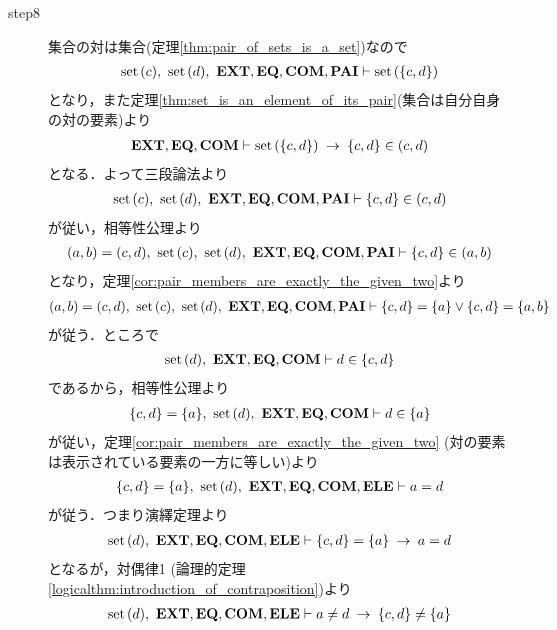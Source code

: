 \begin{sketch}
\begin{description}
			\item[step8] 集合の対は集合(定理\ref{thm:pair_of_sets_is_a_set})なので
				\begin{align}
					\operatorname*{set}\hspace{0.15em}(c),\ \operatorname*{set}\hspace{0.15em}(d),\ \mbox{{\bf EXT}},\mbox{{\bf EQ}},\mbox{\bf COM},\mbox{{\bf PAI}} \vdash \operatorname*{set}\hspace{0.15em}(\{c,d\})
				\end{align}
				となり，また定理\ref{thm:set_is_an_element_of_its_pair}(集合は自分自身の対の要素)より
				\begin{align}
					\mbox{{\bf EXT}},\mbox{{\bf EQ}},\mbox{\bf COM} \vdash \operatorname*{set}\hspace{0.15em}(\{c,d\}) \hspace{0.25em}\rightarrow\hspace{0.25em} \{c,d\} \in (c,d)	
				\end{align}
				となる．よって三段論法より
				\begin{align}
					\operatorname*{set}\hspace{0.15em}(c),\ \operatorname*{set}\hspace{0.15em}(d),\ \mbox{{\bf EXT}},\mbox{{\bf EQ}},\mbox{\bf COM},\mbox{{\bf PAI}} \vdash \{c,d\} \in (c,d)
				\end{align}
				が従い，相等性公理より
				\begin{align}
					(a,b) = (c,d),\ \set{c},\ \set{d},\ \EXTAX,\EQAX,\COMAX,\PAIAX \vdash \{c,d\} \in (a,b)
				\end{align}
				となり，定理\ref{cor:pair_members_are_exactly_the_given_two}より
				\begin{align}
					(a,b) = (c,d),\ \set{c},\ \set{d},\ \EXTAX,\EQAX,\COMAX,\PAIAX 
					\vdash \{c,d\} = \{a\} \vee \{c,d\} = \{a,b\}
					\label{fom:equality_of_ordered_pairs_15}
				\end{align}
				が従う．ところで
				\begin{align}
					\operatorname*{set}\hspace{0.15em}(d),\ \mbox{{\bf EXT}},\mbox{{\bf EQ}},\mbox{\bf COM} \vdash d \in \{c,d\}
					\label{fom:equality_of_ordered_pairs_17}
				\end{align}
				であるから，相等性公理より
				\begin{align}
					\{c,d\} = \{a\},\ \operatorname*{set}\hspace{0.15em}(d),\ \mbox{{\bf EXT}},\mbox{{\bf EQ}},\mbox{\bf COM} \vdash d \in \{a\}
				\end{align}
				が従い，定理\ref{cor:pair_members_are_exactly_the_given_two} (対の要素は表示されている要素の一方に等しい)より
				\begin{align}
					\{c,d\} = \{a\},\ \set{d},\ \EXTAX,\EQAX,\COMAX,\ELEAX \vdash a = d
				\end{align}
				が従う．つまり演繹定理より
				\begin{align}
					\operatorname*{set}\hspace{0.15em}(d),\ \mbox{{\bf EXT}},\mbox{{\bf EQ}},\mbox{\bf COM},\mbox{{\bf ELE}} \vdash \{c,d\} = \{a\} \hspace{0.25em}\rightarrow\hspace{0.25em} a = d
				\end{align}
				となるが，対偶律1 (論理的定理\ref{logicalthm:introduction_of_contraposition})より
				\begin{align}
					\operatorname*{set}\hspace{0.15em}(d),\ \mbox{{\bf EXT}},\mbox{{\bf EQ}},\mbox{\bf COM},\mbox{{\bf ELE}} \vdash a \neq d \hspace{0.25em}\rightarrow\hspace{0.25em} \{c,d\} \neq \{a\}
				\end{align}

\end{description}
\end{sketch}
